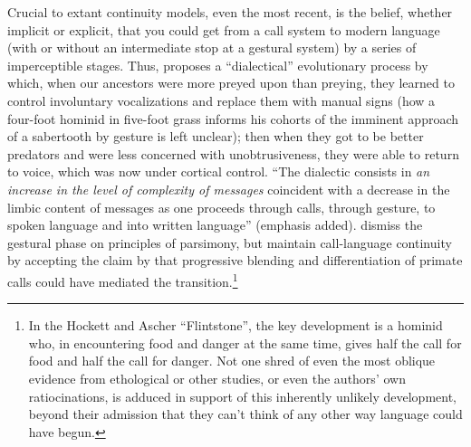 Crucial to extant continuity models, even the most recent, is
the belief, whether implicit or explicit, that you could get from a call system to modern language (with or without an intermediate stop at a gestural system) by a series of imperceptible stages. Thus, \citet{Stephenson1979} proposes a ``dialectical'' evolutionary process by which, when our ancestors were more preyed upon than preying, they learned to control involuntary vocalizations and replace them with manual signs (how a four-foot hominid in five-foot grass informs his cohorts of the imminent approach of a sabertooth by gesture is left unclear); then when they got to be better predators and were less concerned with unobtrusiveness, they were able to return to voice, which was now under cortical control. ``The dialectic consists in \textit{an increase in the level of complexity of messages} coincident with a decrease in the limbic content of messages as one proceeds through calls, through gesture, to spoken language and into written language'' (emphasis added). \citet{SteklisEtAl1979} dismiss the gestural phase on principles of parsimony, but maintain call-language continuity by accepting the claim by \citet{HockettEtAl1964} that progressive blending and differentiation of primate calls could have mediated the transition.\footnote{In the Hockett and Ascher ``Flintstone'', the key development is a hominid who, in encountering food and danger at the same time, gives half the call for food and half the call for danger. Not one shred of even the most oblique evidence from ethological or other studies, or even the authors' own ratiocinations, is adduced in support of this inherently unlikely development, beyond their admission that they can't think of any other way language could have begun.}

